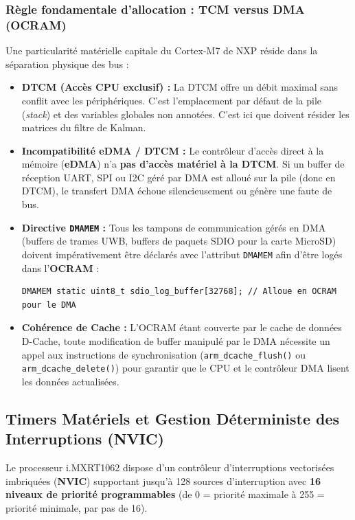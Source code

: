 \documentclass[../Materiel.tex]{subfiles}
\begin{document}
\subsubsection{Règle fondamentale d'allocation : TCM versus DMA (OCRAM)}
Une particularité matérielle capitale du Cortex-M7 de NXP réside dans la séparation physique des bus :
\begin{itemize}
    \item \textbf{DTCM (Accès CPU exclusif) :} La DTCM offre un débit maximal sans conflit avec les périphériques. C'est l'emplacement par défaut de la pile (\textit{stack}) et des variables globales non annotées. C'est ici que doivent résider les matrices du filtre de Kalman.
    \item \textbf{Incompatibilité eDMA / DTCM :} Le contrôleur d'accès direct à la mémoire (\textbf{eDMA}) n'a \textbf{pas d'accès matériel à la DTCM}. Si un buffer de réception UART, SPI ou I2C géré par DMA est alloué sur la pile (donc en DTCM), le transfert DMA échoue silencieusement ou génère une faute de bus.
    \item \textbf{Directive \texttt{DMAMEM} :} Tous les tampons de communication gérés en DMA (buffers de trames UWB, buffers de paquets SDIO pour la carte MicroSD) doivent impérativement être déclarés avec l'attribut \lstinline|DMAMEM| afin d'être logés dans l'\textbf{OCRAM} :
\begin{lstlisting}
DMAMEM static uint8_t sdio_log_buffer[32768]; // Alloue en OCRAM pour le DMA
\end{lstlisting}
    \item \textbf{Cohérence de Cache :} L'OCRAM étant couverte par le cache de données D-Cache, toute modification de buffer manipulé par le DMA nécessite un appel aux instructions de synchronisation (\lstinline|arm_dcache_flush()| ou \lstinline|arm_dcache_delete()|) pour garantir que le CPU et le contrôleur DMA lisent les données actualisées.
\end{itemize}

\subsection{Timers Matériels et Gestion Déterministe des Interruptions (NVIC)}

Le processeur i.MXRT1062 dispose d'un contrôleur d'interruptions vectorisées imbriquées (\textbf{NVIC}) supportant jusqu'à 128 sources d'interruption avec \textbf{16 niveaux de priorité programmables} (de 0 = priorité maximale à 255 = priorité minimale, par pas de 16).
\end{document}
